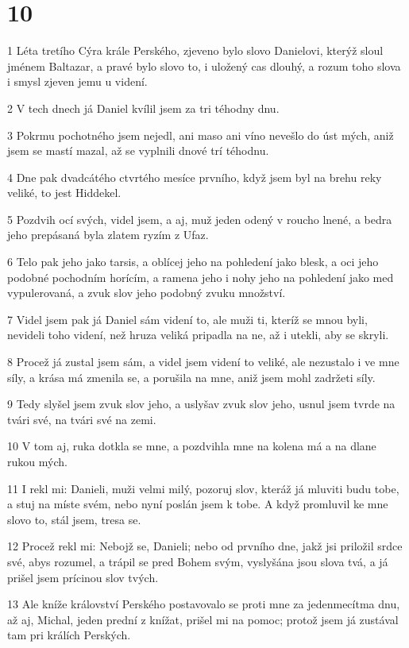 \chapter{10}

\par 1 Léta tretího Cýra krále Perského, zjeveno bylo slovo Danielovi, kterýž sloul jménem Baltazar, a pravé bylo slovo to, i uložený cas dlouhý, a rozum toho slova i smysl zjeven jemu u videní.
\par 2 V tech dnech já Daniel kvílil jsem za tri téhodny dnu.
\par 3 Pokrmu pochotného jsem nejedl, ani maso ani víno nevešlo do úst mých, aniž jsem se mastí mazal, až se vyplnili dnové trí téhodnu.
\par 4 Dne pak dvadcátého ctvrtého mesíce prvního, když jsem byl na brehu reky veliké, to jest Hiddekel.
\par 5 Pozdvih ocí svých, videl jsem, a aj, muž jeden odený v roucho lnené, a bedra jeho prepásaná byla zlatem ryzím z Ufaz.
\par 6 Telo pak jeho jako tarsis, a oblícej jeho na pohledení jako blesk, a oci jeho podobné pochodním horícím, a ramena jeho i nohy jeho na pohledení jako med vypulerovaná, a zvuk slov jeho podobný zvuku množství.
\par 7 Videl jsem pak já Daniel sám videní to, ale muži ti, kteríž se mnou byli, nevideli toho videní, než hruza veliká pripadla na ne, až i utekli, aby se skryli.
\par 8 Procež já zustal jsem sám, a videl jsem videní to veliké, ale nezustalo i ve mne síly, a krása má zmenila se, a porušila na mne, aniž jsem mohl zadržeti síly.
\par 9 Tedy slyšel jsem zvuk slov jeho, a uslyšav zvuk slov jeho, usnul jsem tvrde na tvári své, na tvári své na zemi.
\par 10 V tom aj, ruka dotkla se mne, a pozdvihla mne na kolena má a na dlane rukou mých.
\par 11 I rekl mi: Danieli, muži velmi milý, pozoruj slov, kteráž já mluviti budu tobe, a stuj na míste svém, nebo nyní poslán jsem k tobe. A když promluvil ke mne slovo to, stál jsem, tresa se.
\par 12 Procež rekl mi: Nebojž se, Danieli; nebo od prvního dne, jakž jsi priložil srdce své, abys rozumel, a trápil se pred Bohem svým, vyslyšána jsou slova tvá, a já prišel jsem prícinou slov tvých.
\par 13 Ale kníže království Perského postavovalo se proti mne za jedenmecítma dnu, až aj, Michal, jeden prední z knížat, prišel mi na pomoc; protož jsem já zustával tam pri králích Perských.
